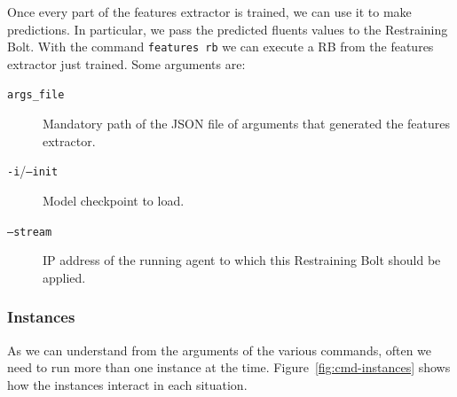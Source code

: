 Once every part of the features extractor is trained, we can use it to make
predictions. In particular, we pass the predicted fluents values to the
Restraining Bolt. With the command \texttt{features rb} we can execute a RB
from the features extractor just trained. Some arguments are:
\begin{description}
	\item [\texttt{args\_file}] Mandatory path of the JSON file of arguments
		that generated the features extractor.
	\item [\texttt{-i}/\texttt{--init}] Model checkpoint to load.
	\item [\texttt{--stream}] IP address of the running agent to which this
		Restraining Bolt should be applied.
\end{description}


\subsubsection*{Instances}

As we can understand from the arguments of the various commands, often we need
to run more than one instance at the time. Figure~\ref{fig:cmd-instances}
shows how the instances interact in each situation.

